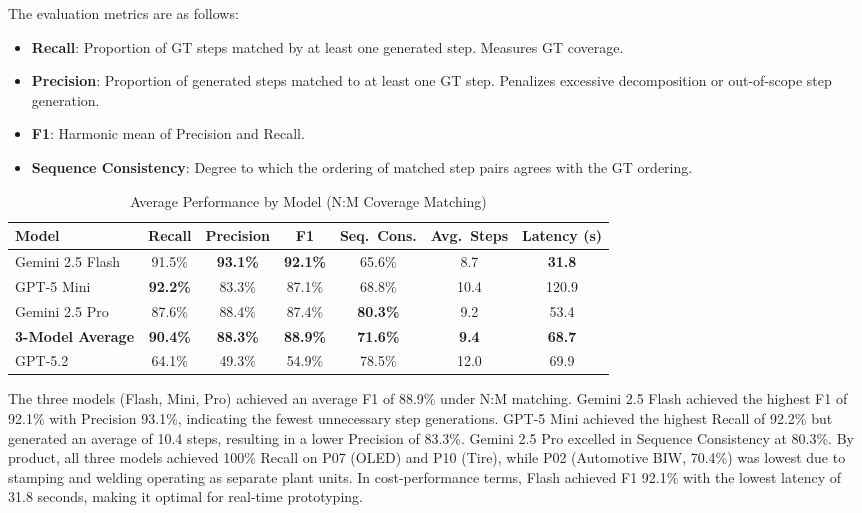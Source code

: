 \documentclass[conference]{IEEEtran}
\begin{document}
The evaluation metrics are as follows:
\begin{itemize}
\item \textbf{Recall}: Proportion of GT steps matched by at least one generated step. Measures GT coverage.
\item \textbf{Precision}: Proportion of generated steps matched to at least one GT step. Penalizes excessive decomposition or out-of-scope step generation.
\item \textbf{F1}: Harmonic mean of Precision and Recall.
\item \textbf{Sequence Consistency}: Degree to which the ordering of matched step pairs agrees with the GT ordering.
\end{itemize}

\begin{table}[!t]
\caption{Average Performance by Model (N:M Coverage Matching)}
\label{tab:model_performance}
\centering
\begin{tabular}{l c c c c c c}
\hline
\textbf{Model} & \textbf{Recall} & \textbf{Precision} & \textbf{F1} & \textbf{Seq.\ Cons.} & \textbf{Avg.\ Steps} & \textbf{Latency (s)} \\
\hline
Gemini 2.5 Flash & 91.5\% & \textbf{93.1\%} & \textbf{92.1\%} & 65.6\% & 8.7 & \textbf{31.8} \\
GPT-5 Mini & \textbf{92.2\%} & 83.3\% & 87.1\% & 68.8\% & 10.4 & 120.9 \\
Gemini 2.5 Pro & 87.6\% & 88.4\% & 87.4\% & \textbf{80.3\%} & 9.2 & 53.4 \\
\hline
\textbf{3-Model Average} & \textbf{90.4\%} & \textbf{88.3\%} & \textbf{88.9\%} & \textbf{71.6\%} & \textbf{9.4} & \textbf{68.7} \\
\hline
GPT-5.2 & 64.1\% & 49.3\% & 54.9\% & 78.5\% & 12.0 & 69.9 \\
\hline
\end{tabular}
\end{table}

The three models (Flash, Mini, Pro) achieved an average F1 of 88.9\% under N:M matching. Gemini 2.5 Flash achieved the highest F1 of 92.1\% with Precision 93.1\%, indicating the fewest unnecessary step generations. GPT-5 Mini achieved the highest Recall of 92.2\% but generated an average of 10.4 steps, resulting in a lower Precision of 83.3\%. Gemini 2.5 Pro excelled in Sequence Consistency at 80.3\%. By product, all three models achieved 100\% Recall on P07 (OLED) and P10 (Tire), while P02 (Automotive BIW, 70.4\%) was lowest due to stamping and welding operating as separate plant units. In cost-performance terms, Flash achieved F1 92.1\% with the lowest latency of 31.8 seconds, making it optimal for real-time prototyping.
\end{document}

